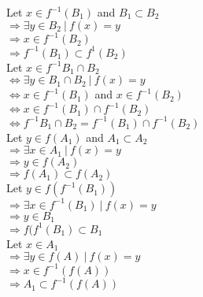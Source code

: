 \documentclass{article}
\begin{document}
\noindent
Let $x \in f^{-1}(B_1) $ and $ B_1 \subset B_2 $\\
$\Rightarrow \exists y \in B_2 \ | \ f(x) = y $\\
$\Rightarrow  x \in f^{-1}(B_2)$\\
$\Rightarrow f^{-1}(B_1) \subset f^{1}(B_2)$\\

\noindent
Let $x \in f^{-1}{B_1 \cap B_2} $\\
$\iff \exists y \in B_1 \cap B_2 \ | \ f(x) = y $\\
$\iff x \in f^{-1}(B_1) $ and
$ x \in f^{-1}(B_2) $\\
$\iff x \in f^{-1}(B_1) \cap f^{-1}(B_2) $\\
$\iff f^{-1}{B_1 \cap B_2} =
 f^{-1}(B_1) \cap f^{-1}(B_2) $\\

\noindent
Let $y \in f(A_1) $ and $ A_1 \subset A_2 $\\
$\Rightarrow \exists x \in A_1 \ | \ f(x) = y $ \\
$\Rightarrow y \in f(A_2)$\\
$\Rightarrow f(A_1) \subset f(A_2)$\\

\noindent
Let $y \in f(f^{-1}(B_1))$\\
$\Rightarrow \exists x \in f^{-1}(B_1) \ | \ f(x) = y$\\
$\Rightarrow y \in B_1 $\\
$\Rightarrow f(f^{1}(B_1) \subset B_1 $\\

\noindent
Let $x \in A_1$\\
$\Rightarrow \exists y \in f(A) \ | \ f(x) = y$\\
$\Rightarrow x \in f^{-1}(f(A)) $\\
$\Rightarrow A_1 \subset f^{-1}(f(A)) $\\
\end{document}
